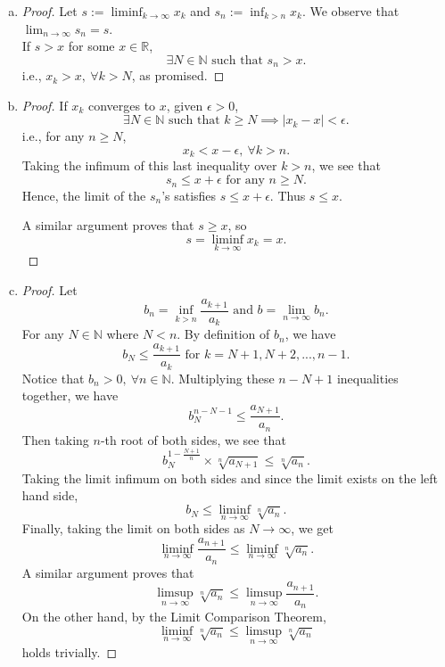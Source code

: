 \documentclass{report}
\begin{document}
\vspace{12pt}
\setcounter{Exercise}{7}
\begin{Exercise}
\begin{enumerate}[a)]
\item
\begin{proof}
Let $s:=\liminf_{k\to\infty}x_k$ and $s_n := \inf_{k>n}x_k$. We observe that $\lim_{n\to\infty}s_n = s$.\\
If $s>x$ for some $x\in\mathbb{R}$, $$\exists N\in\mathbb{N}\text{ such that } s_n>x.$$ i.e., $x_k>x,\ \forall k > N$, as promised.
\end{proof}

\item
\begin{proof}
If $x_k$ converges to $x$, given $\epsilon > 0$, $$\exists N \in\mathbb{N}\text{ such that } k\geq N \implies \left|x_k-x\right|<\epsilon.$$
i.e., for any $n\geq N$, $$x_k<x-\epsilon,\ \forall k>n.$$
Taking the infimum of this last inequality over $k>n$, we see that $$s_n\leq x+\epsilon\text{ for any } n\geq N.$$ Hence, the limit of the $s_n$'s satisfies $s\leq x+\epsilon$. Thus $s\leq x$.

\vspace{2ex}

A similar argument proves that $s\geq x$, so $$s=\liminf_{k\to\infty}x_k=x.$$
\end{proof}

\item
\begin{proof}
Let $$b_n = \inf_{k>n}\frac{a_{k+1}}{a_k} \text{ and } b = \lim_{n\to\infty}b_n.$$
For any $N\in\mathbb{N}$ where $N<n$. By definition of $b_n$, we have $$ b_N\leq\frac{a_{k+1}}{a_k}\text{ for } k=N+1,N+2,...,n-1.$$
Notice that $b_n>0,\ \forall n\in\mathbb{N}$. Multiplying these $n-N+1$ inequalities together, we have $$b_N^{n-N-1}\leq\frac{a_{N+1}}{a_n}.$$ Then taking $n$-th root of both sides, we see that $$b_N^{1-\frac{N+1}{n}} \times \sqrt[n]{a_{N+1}} \leq \sqrt[n]{a_n}.$$
Taking the limit infimum on both sides and since the limit exists on the left hand side, $$b_N \leq \liminf_{n\to\infty}\sqrt[n]{a_n}.$$
Finally, taking the limit on both sides as $N\to\infty$, we get $$\liminf_{n\to\infty}\frac{a_{n+1}}{a_n} \leq  \liminf_{n\to\infty}\sqrt[n]{a_n}.$$
A similar argument proves that  $$\limsup_{n\to\infty}\sqrt[n]{a_n} \leq \limsup_{n\to\infty}\frac{a_{n+1}}{a_n}.$$
On the other hand, by the Limit Comparison Theorem, $$\liminf_{n\to\infty}\sqrt[n]{a_n} \leq \limsup_{n\to\infty}\sqrt[n]{a_n}$$
holds trivially. 


\end{proof}
\end{enumerate}
\end{Exercise}
\end{document}
